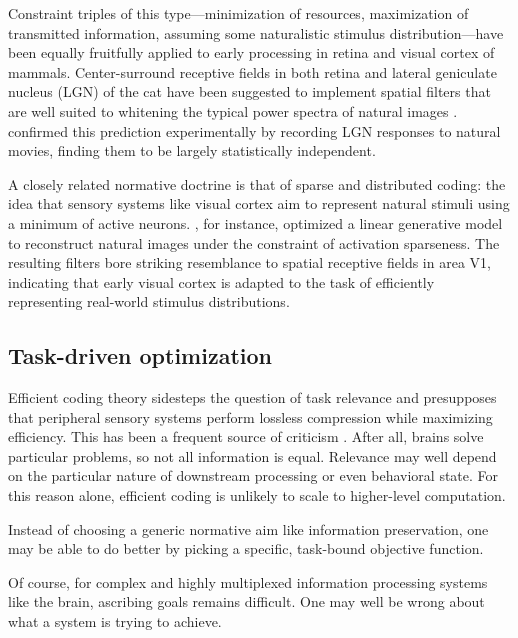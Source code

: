 Constraint triples of this type---minimization of resources, maximization of transmitted information, assuming some naturalistic stimulus distribution---have been equally fruitfully applied to early processing in retina and visual cortex of mammals. Center-surround receptive fields in both retina and lateral geniculate nucleus (LGN) of the cat have been suggested to implement spatial filters that are well suited to whitening the typical power spectra of natural images \citep{vanHateren:1992aa,vanHateren:1993aa,Atick:1992aa}. \citet{Dan:1996aa} confirmed this prediction experimentally by recording LGN responses to natural movies, finding them to be largely statistically independent.

A closely related normative doctrine is that of sparse and distributed coding: the idea that sensory systems like visual cortex aim to represent natural stimuli using a minimum of active neurons. \citet{Ohlshausen:1996aa}, for instance, optimized a linear generative model to reconstruct natural images under the constraint of activation sparseness. The resulting filters bore striking resemblance to spatial receptive fields in area V1, indicating that early visual cortex is adapted to the task of efficiently representing real-world stimulus distributions.

\subsection{Task-driven optimization}
Efficient coding theory sidesteps the question of task relevance and presupposes that peripheral sensory systems perform lossless compression while maximizing efficiency. This has been a frequent source of criticism \citep{Simoncelli:2003aa}. After all, brains solve particular problems, so not all information is equal. Relevance may well depend on the particular nature of downstream processing or even behavioral state. For this reason alone, efficient coding is unlikely to scale to higher-level computation.

Instead of choosing a generic normative aim like information preservation, one may be able to do better by picking a specific, task-bound objective function.

Of course, for complex and highly multiplexed information processing systems like the brain, ascribing goals remains difficult. One may well be wrong about what a system is trying to achieve.


